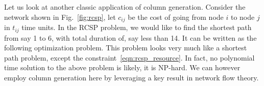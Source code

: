 \documentclass[letterpaper, 10pt, twocolumn, reqno]{amsart}
\begin{document}
Let us look at another classic application of column generation. Consider the network shown in Fig.~\ref{fig:rcsp}, let $c_{ij}$ be the cost of going from node $i$ to node $j$ in $t_{ij}$ time units. In the RCSP problem, we would like to find the shortest path from say 1 to 6, with total duration of, say less than 14. It can be written as the following optimization problem.
This problem looks very much like a shortest path problem, except the constraint~\eqref{eqn:rcsp_resource}. In fact, no polynomial time solution to the above problem is likely, it is NP-hard. We can however employ column generation here by leveraging a key result in network flow theory.
\end{document}
